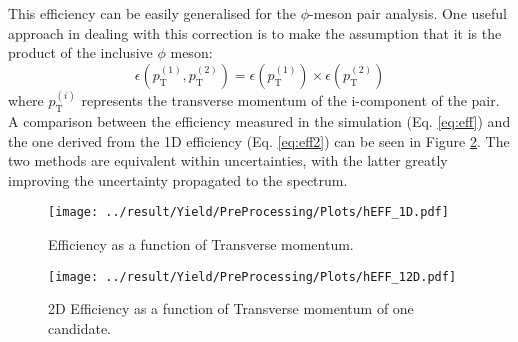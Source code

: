 This efficiency can be easily generalised for the $\phi$-meson pair analysis. One useful approach in dealing with this correction is to make the assumption that it is the product of the inclusive $\phi$ meson:
\begin{equation}
\epsilon(p_{\text{T}}^{(1)},p_{\text{T}}^{(2)}) = \epsilon(p_{\text{T}}^{(1)}) \times \epsilon(p_{\text{T}}^{(2)})
\label{eq:eff2}
\end{equation}
where $p_{\text{T}}^{(i)}$ represents the transverse momentum of the i-component of the pair. A comparison between the efficiency measured in the simulation (Eq. \ref{eq:eff}) and the one derived from the 1D efficiency (Eq. \ref{eq:eff2}) can be seen in Figure \ref{fig:eff2d}. The two methods are equivalent within uncertainties, with the latter greatly improving the uncertainty propagated to the spectrum.

\begin{figure}[!h]
\centering
\texttt{[image: ../result/Yield/PreProcessing/Plots/hEFF\_1D.pdf]}
\caption{Efficiency as a function of Transverse momentum.}
\label{fig:eff1d}
\end{figure}

\begin{figure}[!h]
\centering
\texttt{[image: ../result/Yield/PreProcessing/Plots/hEFF\_12D.pdf]}
\caption{2D Efficiency as a function of Transverse momentum of one candidate.}
\label{fig:eff2d}
\end{figure}

